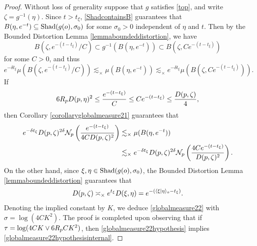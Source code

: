\begin{proof}
Without loss of generality suppose that $g$ satisfies \eqref{top}, and write $\zeta = g^{-1}(\eta)$. Since $t > t_\xi$, \eqref{ShadcontainsB} guarantees that $B(\eta,e^{-t}) \subseteq \operatorname{Shad}(g(o),\sigma_0)$ for some $\sigma_0 > 0$ independent of $\eta$ and $t$. Then by the Bounded Distortion Lemma \ref{lemmaboundeddistortion}, we have
\[
B(\zeta, e^{-(t - t_\xi)}/C) \subset g^{-1}(B(\eta,e^{-t})) \subset B(\zeta,C e^{-(t - t_\xi)})
\]
for some $C > 0$, and thus
\[
e^{-\delta t_\xi} \mu(B(\zeta, e^{-(t - t_\xi)}/C)) \lesssim_\times  \mu(B(\eta,e^{-t})) \lesssim_\times e^{-\delta t_\xi} \mu(B(\zeta,C e^{-(t - t_\xi)})).
\]
If
\begin{equation}
\label{globalmeasure22hypothesisinternal}
6R_p D(p,\eta)^2 \leq \frac{e^{-(t - t_\xi)}}{C} \leq C e^{-(t - t_\xi)} \leq \frac{D(p,\zeta)}{4},
\end{equation}
then Corollary \ref{corollaryglobalmeasure21} guarantees that
\begin{align*}
e^{-\delta t_\xi} D(p,\zeta)^{2\delta} \mathcal N_p\left(\frac{e^{-(t - t_\xi)}}{4CD(p,\zeta)^2}\right)
&\lesssim_\times \mu(B(\eta,e^{-t}))\\
&\lesssim_\times e^{-\delta t_\xi}D(p,\zeta)^{2\delta} \mathcal N_p\left(\frac{4C e^{-(t - t_\xi)}}{D(p,\zeta)^2}\right).
\end{align*}
On the other hand, since $\xi,\eta\in\operatorname{Shad}(g(o),\sigma_0)$, the Bounded Distortion Lemma \ref{lemmaboundeddistortion} guarantees that
\[
D(p,\zeta) \asymp_\times e^{t_\xi} D(\xi,\eta) = e^{-(\langle \xi|\eta\rangle_o - t_\xi)}.
\]
Denoting the implied constant by $K$, we deduce \eqref{globalmeasure22} with $\sigma = \log(4CK^2)$. The proof is completed upon observing that if $\tau = \log(4CK\vee 6R_p CK^2)$, then \eqref{globalmeasure22hypothesis} implies \eqref{globalmeasure22hypothesisinternal}.
\end{proof}

